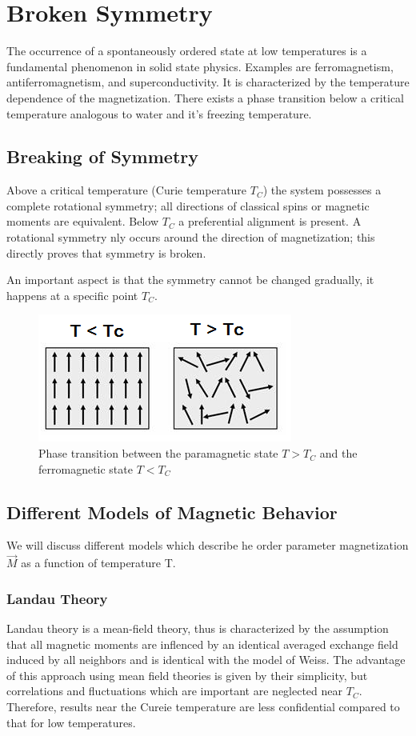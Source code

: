 \documentclass[10pt]{article} %
\begin{document}
\section{Broken Symmetry} %
The occurrence of a spontaneously ordered state at low temperatures is a fundamental phenomenon in solid state physics. Examples are ferromagnetism, antiferromagnetism, and superconductivity. It is characterized by the temperature dependence of the magnetization. There exists a phase transition below a critical temperature analogous to water and it's freezing temperature.

\subsection{Breaking of Symmetry}
Above a critical temperature (Curie temperature $T_C$) the system possesses a complete rotational symmetry; all directions of classical spins or magnetic moments are equivalent. Below $T_C$ a preferential alignment is present. A rotational symmetry nly occurs around the direction of magnetization; this directly proves that symmetry is broken. 

An important aspect is that the symmetry cannot be changed gradually, it happens at a specific point $T_C$.

\begin{figure}[H]
\begin{center}
\includegraphics[scale=1.0]{curietemp}
\caption{Phase transition between the paramagnetic state $T > T_C$ and the ferromagnetic state $T < T_C$}
\end{center}
\end{figure}

\subsection{Different Models of Magnetic Behavior}
We will discuss different models which describe he order parameter magnetization $\vec{M}$ as a function of temperature T.

\subsubsection{Landau Theory}
Landau theory is a mean-field theory, thus is characterized by the assumption that all magnetic moments are inflenced by an identical averaged exchange field induced by all neighbors and is identical with the model of Weiss. The advantage of this approach using mean field theories is given by their simplicity, but correlations and fluctuations which are important are neglected near $T_C$. Therefore, results near the Cureie temperature are less confidential compared to that for low temperatures. 
\end{document}
